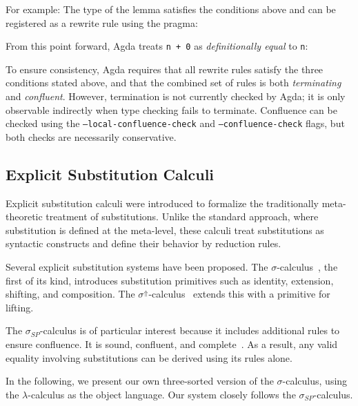\documentclass[screen,nonacm]{acmart}
\begin{document}
For example: \ERewrite{} The type of the lemma satisfies the conditions above
and can be registered as a rewrite rule using the  pragma:
\ERewriteIt{}

From this point forward, Agda treats \verb|n + 0| as \emph{definitionally
      equal} to \verb|n|: \ERewriteEx

To ensure consistency, Agda requires that all rewrite rules satisfy the three
conditions stated above, and that the combined set of rules is both
\emph{terminating} and \emph{confluent}. However, termination is not currently
checked by Agda; it is only observable indirectly when type checking fails to
terminate. Confluence can be checked using the
\texttt{--local-confluence-check} and \texttt{--confluence-check} flags, but
both checks are necessarily conservative.

\subsection{Explicit Substitution Calculi}\label{sec:pre-sig}

Explicit substitution calculi were introduced to formalize the traditionally
meta-theoretic treatment of substitutions. Unlike the standard approach, where
substitution is defined at the meta-level, these calculi treat substitutions as
syntactic constructs and define their behavior by reduction rules.

Several explicit substitution systems have been proposed. The
$\sigma$-calculus~\cite{CITE3}, the first of its kind, introduces substitution
primitives such as identity, extension, shifting, and composition. The
$\sigma^\Uparrow$-calculus~\cite{CITE4} extends this with a primitive for
lifting.

The $\sigma_{SP}$-calculus is of particular interest because it includes
additional rules to ensure confluence. It is sound, confluent, and
complete~\cite{CITE}. As a result, any valid equality involving substitutions
can be derived using its rules alone.

In the following, we present our own three-sorted version of the
$\sigma$-calculus, using the $\lambda$-calculus as the object language. Our
system closely follows the $\sigma_{SP}$-calculus.
\end{document}
